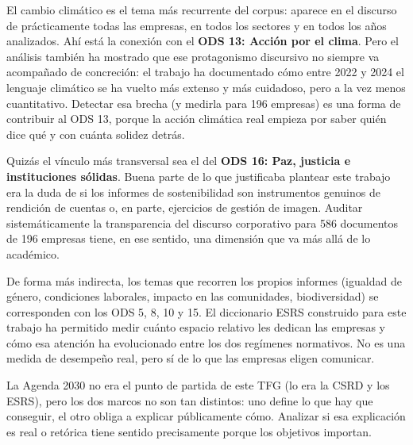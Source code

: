 El cambio climático es el tema más recurrente del corpus: aparece en el discurso de
prácticamente todas las empresas, en todos los sectores y en todos los años analizados.
Ahí está la conexión con el \textbf{ODS 13: Acción por el clima}. Pero el análisis también
ha mostrado que ese protagonismo discursivo no siempre va acompañado de concreción: el
trabajo ha documentado cómo entre 2022 y 2024 el lenguaje climático se ha vuelto más
extenso y más cuidadoso, pero a la vez menos cuantitativo. Detectar esa brecha (y medirla
para 196 empresas) es una forma de contribuir al ODS 13, porque la acción climática real
empieza por saber quién dice qué y con cuánta solidez detrás.

Quizás el vínculo más transversal sea el del \textbf{ODS 16: Paz, justicia e instituciones sólidas}. 
Buena parte de lo que justificaba plantear este trabajo era la duda de si
los informes de sostenibilidad son instrumentos genuinos de rendición de cuentas o, en
parte, ejercicios de gestión de imagen. Auditar sistemáticamente la transparencia del
discurso corporativo para 586 documentos de 196 empresas tiene, en ese sentido, una
dimensión que va más allá de lo académico.

De forma más indirecta, los temas que recorren los propios informes (igualdad de género,
condiciones laborales, impacto en las comunidades, biodiversidad) se corresponden con los
ODS 5, 8, 10 y 15. El diccionario ESRS construido para este trabajo ha permitido medir
cuánto espacio relativo les dedican las empresas y cómo esa atención ha evolucionado entre
los dos regímenes normativos. No es una medida de desempeño real, pero sí de lo que las
empresas eligen comunicar.

La Agenda 2030 no era el punto de partida de este TFG (lo era la CSRD y los ESRS), pero
los dos marcos no son tan distintos: uno define lo que hay que conseguir, el otro obliga a
explicar públicamente cómo. Analizar si esa explicación es real o retórica tiene sentido
precisamente porque los objetivos importan.

